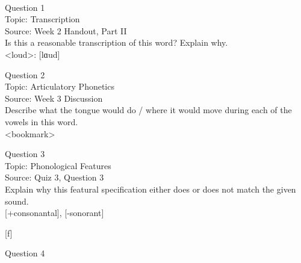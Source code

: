 \documentclass[12pt]{article}
\begin{document}
\newpage

\begin{center}
\textbf{{\color{red}{\HUGE END OF EXAM}}}\\

\end{center}
\newpage

\begin{center}
\textbf{{\color{blue}{\HUGE START OF EXAM\\}}}

\textbf{{\color{blue}{\HUGE Student ID: 43803\\}}}

\textbf{{\color{blue}{\HUGE \\}}}

\end{center}
\newpage

{\large Question 1}\\

Topic: Transcription\\
Source: Week 2 Handout, Part II\\

Is this a reasonable transcription of this word? Explain why.\\

<loud>: {[lɑud]}


\newpage

{\large Question 2}\\

Topic: Articulatory Phonetics\\
Source: Week 3 Discussion\\

Describe what the tongue would do / where it would move during each of the vowels in this word.\\

<bookmark>


\newpage

{\large Question 3}\\

Topic: Phonological Features\\
Source: Quiz 3, Question 3\\

Explain why this featural specification either does or does not match the given sound.\\

{[+consonantal]}, {[-sonorant]}

{[f]}


\newpage

{\large Question 4}\\
\end{document}
